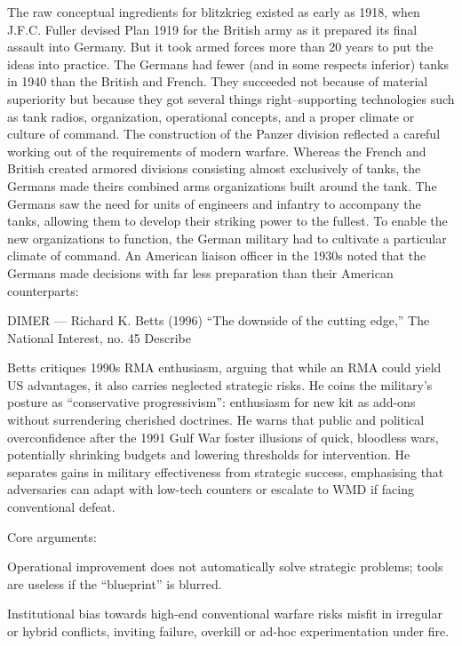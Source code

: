  The raw conceptual ingredients for blitzkrieg existed as early as 1918,
when J.F.C. Fuller devised Plan 1919 for the British army as it prepared its final assault into Germany. But it took armed forces more
than 20 years to put the ideas into practice. The Germans had fewer (and in some respects inferior) tanks in 1940 than the British
and French. They succeeded not because of material superiority but because they got several things right--supporting technologies
such as tank radios, organization, operational concepts, and a proper climate or culture of command.
The construction of the Panzer division reflected a careful working out of the requirements of modern warfare. Whereas the French
and British created armored divisions consisting almost exclusively of tanks, the Germans made theirs combined arms organizations
built around the tank. The Germans saw the need for units of engineers and infantry to accompany the tanks, allowing them to
develop their striking power to the fullest. To enable the new organizations to function, the German military had to cultivate a
particular climate of command. An American liaison officer in the 1930s noted that the Germans made decisions with far less
preparation than their American counterparts:	





DIMER — Richard K. Betts (1996) “The downside of the cutting edge,” The National Interest, no. 45
Describe

Betts critiques 1990s RMA enthusiasm, arguing that while an RMA could yield US advantages, it also carries neglected strategic risks. He coins the military’s posture as “conservative progressivism”: enthusiasm for new kit as add-ons without surrendering cherished doctrines. He warns that public and political overconfidence after the 1991 Gulf War foster illusions of quick, bloodless wars, potentially shrinking budgets and lowering thresholds for intervention. He separates gains in military effectiveness from strategic success, emphasising that adversaries can adapt with low-tech counters or escalate to WMD if facing conventional defeat.

Core arguments:

Operational improvement does not automatically solve strategic problems; tools are useless if the “blueprint” is blurred.

Institutional bias towards high-end conventional warfare risks misfit in irregular or hybrid conflicts, inviting failure, overkill or ad-hoc experimentation under fire.

